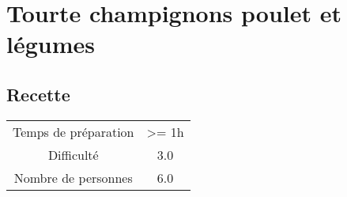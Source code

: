 \newpage
\section{Tourte champignons poulet et légumes}
    \label{sec:Tourte champignons poulet et légumes}
    \subsection{Recette}
    \vspace{1cm}


    \begin{center}
        \begin{tabular}{c|c}
            Temps de préparation & >= 1h \\
            Difficulté & 3.0 \\
            Nombre de personnes & 6.0 
        \end{tabular}
    \end{center}{}

    \vspace{1cm}
    \hline
    \vspace{1cm}

